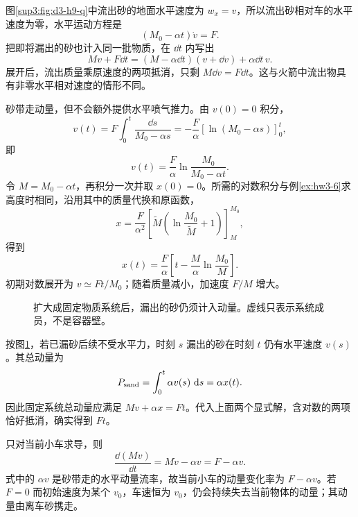 \begin{solution}
图\ref{sup3:fig:d3-h9-q}中流出砂的地面水平速度为 $w_x=v$，所以流出砂相对车的水平速度为零，水平运动方程是
\[
(M_0-\alpha t)\dot v=F.
\]
把即将漏出的砂也计入同一批物质，在 $\dd t$ 内写出
\[
Mv+F\dd t=(M-\alpha\dd t)(v+\dd v)+\alpha\dd t\,v.
\]
展开后，流出质量乘原速度的两项抵消，只剩 $M\dd v=F\dd t$。这与火箭中流出物具有非零水平相对速度的情形不同。

砂带走动量，但不会额外提供水平喷气推力。由 $v(0)=0$ 积分，
\[
v(t)=F\int_0^t\frac{\dd s}{M_0-\alpha s}
=-\frac F\alpha[\ln(M_0-\alpha s)]_0^t,
\]
即
\[
v(t)=\frac F\alpha\ln\frac{M_0}{M_0-\alpha t}.
\]
令 $M=M_0-\alpha t$，再积分一次并取 $x(0)=0$。所需的对数积分与例\ref{ex:hw3-6}求高度时相同，沿用其中的质量代换和原函数，
\[
x=\frac F{\alpha^2}
\left[\widetilde M\left(\ln\frac{M_0}{\widetilde M}+1\right)\right]_{M}^{M_0},
\]
得到
\[
x(t)=\frac F\alpha\left[t-\frac M\alpha\ln\frac{M_0}M\right].
\]
初期对数展开为 $v\simeq Ft/M_0$；随着质量减小，加速度 $F/M$ 增大。
\begin{figure}[H]\centering
{}
\caption{扩大成固定物质系统后，漏出的砂仍须计入动量。虚线只表示系统成员，不是容器壁。}\label{sup3:fig:d3-h9-s}
\end{figure}
按图\ref{sup3:fig:d3-h9-s}，若已漏砂后续不受水平力，时刻 $s$ 漏出的砂在时刻 $t$ 仍有水平速度 $v(s)$。其总动量为
\[
P_{\rm sand}=\int_0^t\alpha v(s)\,\mathop{}\!\mathrm d s=\alpha x(t).
\]
因此固定系统总动量应满足 $Mv+\alpha x=Ft$。代入上面两个显式解，含对数的两项恰好抵消，确实得到 $Ft$。

只对当前小车求导，则
\[
\frac{\dd(Mv)}{\dd t}=M\dot v-\alpha v=F-\alpha v.
\]
式中的 $\alpha v$ 是砂带走的水平动量流率，故当前小车的动量变化率为 $F-\alpha v$。若 $F=0$ 而初始速度为某个 $v_0$，车速恒为 $v_0$，仍会持续失去当前物体的动量；其动量由离车砂携走。
\end{solution}


